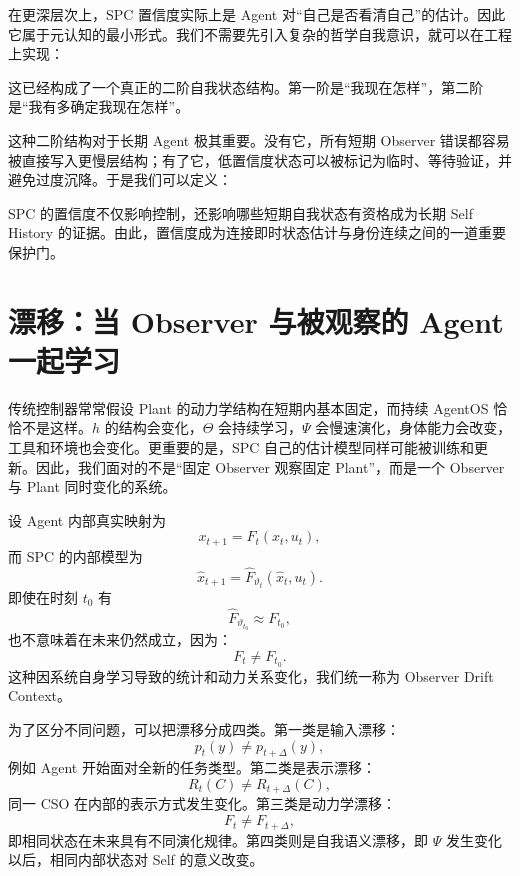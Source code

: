 在更深层次上，SPC 置信度实际上是 Agent 对“自己是否看清自己”的估计。因此它属于元认知的最小形式。我们不需要先引入复杂的哲学自我意识，就可以在工程上实现：
\begin{statementbox}
\centering
{}
\end{statementbox}
这已经构成了一个真正的二阶自我状态结构。第一阶是“我现在怎样”，第二阶是“我有多确定我现在怎样”。

这种二阶结构对于长期 Agent 极其重要。没有它，所有短期 Observer 错误都容易被直接写入更慢层结构；有了它，低置信度状态可以被标记为临时、等待验证，并避免过度沉降。于是我们可以定义：
\begin{statementbox}
\centering
{}
\end{statementbox}
SPC 的置信度不仅影响控制，还影响哪些短期自我状态有资格成为长期 Self History 的证据。由此，置信度成为连接即时状态估计与身份连续之间的一道重要保护门。

\section{漂移：当 Observer 与被观察的 Agent 一起学习}
\label{sec:spc-drift}

传统控制器常常假设 Plant 的动力学结构在短期内基本固定，而持续 AgentOS 恰恰不是这样。$h$ 的结构会变化，$\Theta$ 会持续学习，$\Psi$ 会慢速演化，身体能力会改变，工具和环境也会变化。更重要的是，SPC 自己的估计模型同样可能被训练和更新。因此，我们面对的不是“固定 Observer 观察固定 Plant”，而是一个 Observer 与 Plant 同时变化的系统。

设 Agent 内部真实映射为
\begin{equation}
x_{t+1}
=
F_t(x_t,u_t),
\end{equation}
而 SPC 的内部模型为
\begin{equation}
\hat x_{t+1}
=
\hat F_{\vartheta_t}(\hat x_t,u_t).
\end{equation}
即使在时刻 $t_0$ 有
\begin{equation}
\hat F_{\vartheta_{t_0}}
\approx
F_{t_0},
\end{equation}
也不意味着在未来仍然成立，因为：
\begin{equation}
F_t
\neq
F_{t_0}.
\end{equation}
这种因系统自身学习导致的统计和动力关系变化，我们统一称为 Observer Drift Context。

为了区分不同问题，可以把漂移分成四类。第一类是输入漂移：
\begin{equation}
p_t(y)
\neq
p_{t+\Delta}(y),
\end{equation}
例如 Agent 开始面对全新的任务类型。第二类是表示漂移：
\begin{equation}
R_t(C)
\neq
R_{t+\Delta}(C),
\end{equation}
同一 CSO 在内部的表示方式发生变化。第三类是动力学漂移：
\begin{equation}
F_t
\neq
F_{t+\Delta},
\end{equation}
即相同状态在未来具有不同演化规律。第四类则是自我语义漂移，即 $\Psi$ 发生变化以后，相同内部状态对 Self 的意义改变。

